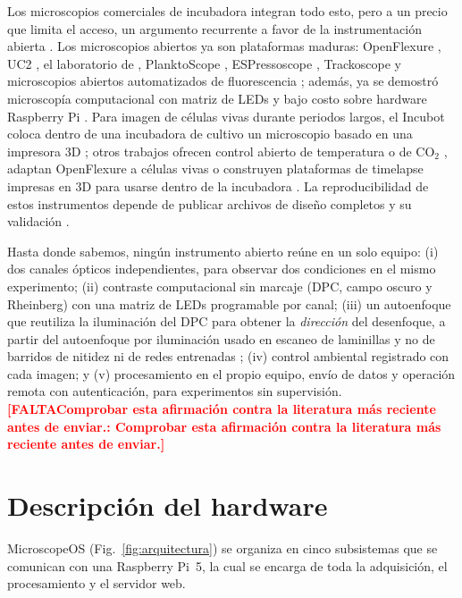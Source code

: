 \documentclass[preprint,12pt]{elsarticle}
\DeclareRobustCommand{\TODO}[1]{\textcolor{red}{\textbf{[FALTA\ifx\relax#1\relax\else: #1\fi]}}}
\begin{document}
Los microscopios comerciales de incubadora integran todo esto, pero a un
precio que limita el acceso, un argumento recurrente a favor de la
instrumentación abierta \cite{Ref027,Ref024,Ref023,Ref026}. Los
microscopios abiertos ya son plataformas maduras: OpenFlexure
\cite{Collins2020OFM}, UC2 \cite{Ref040}, el laboratorio de
 \cite{Ref043}, PlanktoScope \cite{Ref036}, ESPressoscope
\cite{Ref032}, Trackoscope \cite{Ref029} y microscopios abiertos
automatizados de fluorescencia \cite{Ref030}; además, ya se demostró
microscopía computacional con matriz de LEDs y bajo costo sobre hardware
Raspberry Pi \cite{Ref042}. Para imagen de células vivas durante periodos
largos, el Incubot coloca dentro de una incubadora de cultivo un
microscopio basado en una impresora 3D \cite{Merces2021}; otros trabajos
ofrecen control abierto de temperatura o de CO$_2$
\cite{OCarroll2023,Talebipour2024,Rossi2022,Chen2021PrintrLab}, adaptan
OpenFlexure a células vivas \cite{Kearns2026OFMLive} o construyen
plataformas de timelapse impresas en 3D para usarse dentro de la
incubadora \cite{Sato2026DIY}. La reproducibilidad de estos instrumentos
depende de publicar archivos de diseño completos y su validación
\cite{Ref025}.

Hasta donde sabemos, ningún instrumento abierto reúne en un solo equipo:
(i) dos canales ópticos independientes, para observar dos condiciones en
el mismo experimento; (ii) contraste computacional sin marcaje (DPC, campo
oscuro y Rheinberg) con una matriz de LEDs programable por canal; (iii) un
autoenfoque que reutiliza la iluminación del DPC para obtener la
\emph{dirección} del desenfoque, a partir del autoenfoque por iluminación
usado en escaneo de laminillas \cite{Liao2016Autofocus} y no de barridos
de nitidez ni de redes entrenadas \cite{Pinkard2019,Luo2021Autofocus};
(iv) control ambiental registrado con cada imagen; y (v) procesamiento en
el propio equipo, envío de datos y operación remota con autenticación,
para experimentos sin supervisión. \TODO{Comprobar esta afirmación contra
la literatura más reciente antes de enviar.}

\section{Descripción del hardware}

MicroscopeOS (Fig.~\ref{fig:arquitectura}) se organiza en cinco subsistemas
que se comunican con una Raspberry Pi~5, la cual se encarga de toda la
adquisición, el procesamiento y el servidor web.
\end{document}
